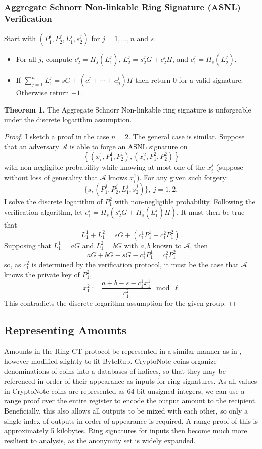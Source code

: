 \documentclass[12pt,english]{mrl}
\theoremstyle{definition}
\newtheorem{thm}[lem]{Theorem}
\numberwithin{equation}{section}
\numberwithin{figure}{section}
\numberwithin{equation}{section}
\numberwithin{equation}{section}
\numberwithin{figure}{section}
\begin{document}
\subsubsection{ Aggregate Schnorr Non-linkable Ring Signature (ASNL) Verification}
Start with $(P_1^j, P_2^j, L_1^j, s_2^j)$ for $j=1,...,n$ and $s$. 
\begin{itemize}
 \item For all $j$, compute $c_2^j = H_s (L_1^j)$, $L_2^j = s_2^j G + c_2^j H$, and $c_1^j = H_s(L_2^j)$. 
 \item If $\sum_{j=1}^n L_1^j = s G + (c_1^j + \cdots + c_n^j) H$ then return $0$ for a valid signature.  Otherwise return $-1$. 
\end{itemize}
 \begin{thm}
 The Aggregate Schnorr Non-linkable ring signature is unforgeable under the discrete logarithm assumption.  
 \end{thm}
\begin{proof}
 I sketch a proof in the case $n=2$. The general case is similar. Suppose that an adversary $\mathcal{A}$ is able to forge an ASNL signature on 
\[
  \left\{ (x_i^1, P_1^1, P_2^1), (x_i^2, P_1^2, P_2^2) \right\}
 \]
 with non-negligible probability while knowing at most one of the $x_i^j$ (suppose without loss of generality that $\mathcal{A}$ knows $x_i^1$). For any given such forgery:
 \[
  \{s,(P_1^j, P_2^j, L_1^j, s_2^j)\},\ j=1,2,
 \]
I solve the discrete logarithm of $P_1^2$ with non-negligible probability. Following the verification algorithm, let $c_1^j = H_s\left(s_2^j G + H_s(L_1^j)H\right)$. It must then be true that 
\[
 L_1^1 + L_1^2 = sG + \left(c_1^1 P_1^1 + c_1^2 P_1^2\right).
\]
Supposing that $L_1^1 = a G$ and $L_1^2 = bG$ with $a,b$ known to $\mathcal{A}$, then 
\[ 
 aG + bG - sG - c_1^1 P_1^1 = c_1^2 P_1^2
\]
so, as $c_1^2$ is determined by the verification protocol, it must be the case that $\mathcal{A}$ knows the private key of $P_1^2$, 
\[
 x_1^2 := \frac{a+b-s-c_1^1 x_1^1}{c_1^2} \mod \ell
\]
 This contradicts the discrete logarithm assumption for the given group. 
\end{proof}
\subsection{Representing Amounts }
Amounts in the Ring CT protocol be represented in a similar manner as in \cite{GM}, however modified slightly to fit ByteRub.
CryptoNote coins organize denominations of coins into a databases of indices, so that they may be referenced in order of their appearance as inputs for ring signatures. As all values in CryptoNote coins are represented as 64-bit unsigned integers, we can use a range proof over the entire register to encode the output amount to the recipient. Beneficially, this also allows all outputs to be mixed with each other, so only a single index of outputs in order of appearance is required. A range proof of this is approximately 5 kilobytes. Ring signatures for inputs then become much more resilient to analysis, as the anonymity set is widely expanded.
\end{document}
